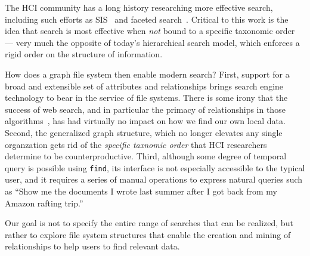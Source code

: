 The HCI community has a long history researching
more effective search, including such efforts as
SIS~\cite{dumais2016stuff} and faceted search~\cite{arenas2016faceted,tunkelang2009faceted,hearst2006design,klungre2018evaluating,walton2017looking,cleverley2015retrieving}.
Critical to this work is the idea that search is most effective
when \textit{not} bound to a specific taxonomic order --- very much the opposite of today's 
hierarchical search model, which enforces a rigid
order on the structure of information.

How does a graph file system then enable modern search?
First, support for a broad and extensible set of attributes and 
relationships brings search engine technology to bear in the
service of file systems.
There is some irony that the success of web search, and in particular the
primacy of relationships in those algorithms~\cite{page1999pagerank}, has had
virtually no impact on how we find our own local data.
Second, the generalized graph structure, which no longer elevates any single
organzation gets rid of the \textit{specific taxnomic order} that HCI
researchers determine to be counterproductive.
Third, although some degree of temporal query is possible using \texttt{find},
its interface is not especially accessible to the typical user, and it requires
a series of manual operations to express natural queries such as
``Show me the documents I wrote last summer after I got back from my Amazon
rafting trip.''

Our goal is not to specify the entire range of searches that can be realized, but rather to
explore file system structures that enable the creation and mining of relationships to help users to find relevant data.

\begin{comment}
To help motivate our work, we consider the \textit{Graph Query 
Language}~\footnote{https://gql.today/wp-content/uploads/2018/05/a-proposal-to-the-database-industry-not-three-but-one-gql.pdf} 
(GQL) as a starting point.  GQL is an emerging language
attuned to the needs of \textit{property graphs}, which happen to be similar to the model that we envision for our new
file system.  It attempts to merge the strengths of three existing graph database query languages into a single, standard,
query language for property graphs~\cite{van2016pgql,francis2018cypher,angles2018g}.

\end{comment}
